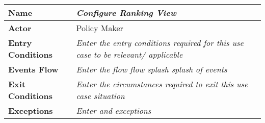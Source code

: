 
\begin{center}
\begin{tabular}{|l|>{\raggedright\arraybackslash}m{12cm}|}

    \hline
    \textbf{Name} & \textit{Configure Ranking View}\\
    \hline
   	\textbf{Actor} & Policy Maker\\
    \hline
    \textbf{Entry Conditions} & \textit{Enter the entry conditions required for this use case to be relevant/ applicable}\\
    \hline
    \textbf{Events Flow} & \textit{Enter the flow flow splash splash of events}\\
    \hline
    \textbf{Exit Conditions} & \textit{Enter the circumstances required to exit this use case situation}\\
    \hline
    \textbf{Exceptions} & \textit{Enter and exceptions}\\
    \hline
\end{tabular}
\end{center}